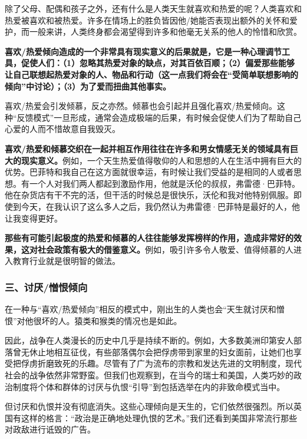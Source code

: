 除了父母、配偶和孩子之外，还有什么是人类天生就喜欢和热爱的呢？人类喜欢和热爱被喜欢和被热爱。许多在情场上的胜负皆因他/她能否表现出额外的关怀和爱护，而一般来讲，人类终身都会渴望得到许多和他毫无关系的他人的怜惜和欣赏。
\par

\textbf{喜欢/热爱倾向造成的一个非常具有现实意义的后果就是，它是一种心理调节工具，促使人们：（1）忽略其热爱对象的缺点，对其百依百顺；（2）偏爱那些能够让自己联想起热爱对象的人、物品和行动（这一点我们将会在“受简单联想影响的倾向”中讨论）；（3）为了爱而扭曲其他事实。}
\par

喜欢/热爱会引发倾慕，反之亦然。倾慕也会引起并且强化喜欢/热爱倾向。这种“反馈模式”一旦形成，通常会造成极端的后果，有时候会促使人们为了帮助自己心爱的人而不惜故意自我毁灭。
\par

\textbf{喜欢/热爱和倾慕交织在一起并相互作用往往在许多和男女情感无关的领域具有巨大的现实意义。}例如，一个天生热爱值得敬仰的人和思想的人在生活中拥有巨大的优势。巴菲特和我自己在这方面就很幸运，有时候让我们受益的是相同的人或者思想。有一个人对我们两人都起到激励作用，他就是沃伦的叔叔，弗雷德·巴菲特。他在杂货店有干不完的活，但干活的时候总是很快乐，沃伦和我对他特别佩服。即使到今天，在我认识了这么多人之后，我仍然认为弗雷德·巴菲特是最好的人，他让我变得更好。
\par

\textbf{那些有可能引起极度的热爱和倾慕的人往往能够发挥榜样的作用，造成非常好的效果，这对社会政策有极大的借鉴意义。}例如，吸引许多令人敬爱、值得倾慕的人进入教育行业就是很明智的做法。
\par

\subsubsection*{三、讨厌/憎恨倾向}

在一种与“喜欢/热爱倾向”相反的模式中，刚出生的人类也会“天生就讨厌和憎恨”对他很坏的人。猿类和猴类的情况也是如此。
\par

因此，战争在人类漫长的历史中几乎是持续不断的。例如，大多数美洲印第安人部落曾无休止地相互征伐，有些部落偶尔会把俘虏带到家里的妇女面前，让她们也享受把俘虏折磨致死的乐趣。尽管有了广为流布的宗教和发达先进的文明制度，现代社会的战争依然非常野蛮。但我们也观察到，在当今的瑞士和美国，人类巧妙的政治制度将个体和群体的讨厌与仇恨“引导”到包括选举在内的非致命模式当中。
\par

但讨厌和仇恨并没有彻底消失。这些心理倾向是天生的，它们依然很强烈。所以英国有这样的格言：“政治是正确地处理仇恨的艺术。”我们还看到美国非常流行那些对政敌进行诋毁的广告。
\par

